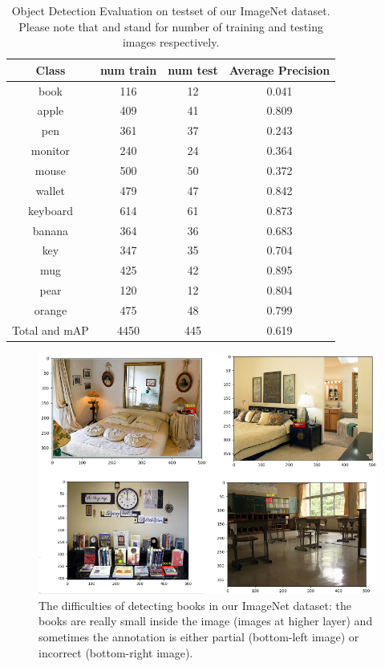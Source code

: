 \begin{table}[h!]
	\centering
	\begin{tabular}{c|c|c|c}
		Class & num train & num test & Average Precision \\
		\hline
		\hline
		book & 116 & 12 & 0.041 \\
		\hline
		apple & 409 & 41 & 0.809 \\
		\hline
		pen & 361 & 37 & 0.243 \\
		\hline
		monitor & 240 & 24 & 0.364 \\
		\hline
		mouse & 500 & 50 & 0.372 \\
		\hline
		wallet & 479 & 47 & 0.842 \\
		\hline
		keyboard & 614 & 61 & 0.873 \\
		\hline
		banana & 364 & 36 & 0.683 \\
		\hline
		key & 347 & 35 & 0.704 \\
		\hline
		mug & 425 & 42 & 0.895 \\
		\hline
		pear & 120 & 12 & 0.804 \\
		\hline
		orange & 475 & 48 & 0.799 \\
		\hline
		Total and mAP & 4450 & 445 & 0.619		
	\end{tabular}
	\caption{Object Detection Evaluation on testset of our ImageNet dataset. Please note that  and  stand for number of training and testing images respectively.}
	\label{table:3}
\end{table}
\begin{figure}[tb]
	\centering
	\includegraphics[width=1.0\hsize]{./figures/bookDifficult}
	\caption{The difficulties of detecting books in our ImageNet dataset: the books are really small inside the image (images at higher layer) and sometimes the annotation is either partial (bottom-left image) or incorrect (bottom-right image).}
	\label{fig:bookDifficult}
\end{figure}

